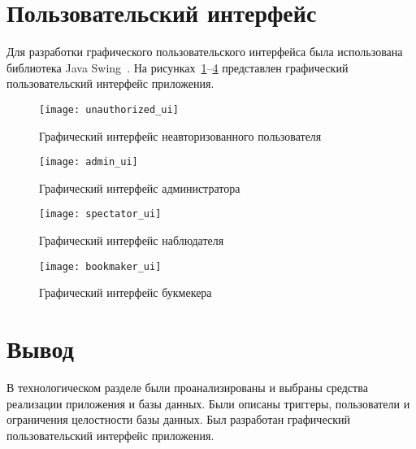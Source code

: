 \section{Пользовательский интерфейс}

Для разработки графического пользовательского интерфейса была использована библиотека Java Swing~\cite{swing}. На рисунках~\ref{unauthorized_ui}--\ref{bookmaker_ui} представлен графический пользовательский интерфейс приложения.
\begin{figure}[H]
	\centering
	\texttt{[image: unauthorized\_ui]}
	\caption{Графический интерфейс неавторизованного пользователя}
	\label{unauthorized_ui}
\end{figure}
\begin{figure}[H]
	\centering
	\texttt{[image: admin\_ui]}
	\caption{Графический интерфейс администратора}
	\label{admin_ui}
\end{figure}
\begin{figure}[H]
	\centering
	\texttt{[image: spectator\_ui]}
	\caption{Графический интерфейс наблюдателя}
	\label{spectator_ui}
\end{figure}
\begin{figure}[H]
	\centering
	\texttt{[image: bookmaker\_ui]}
	\caption{Графический интерфейс букмекера}
	\label{bookmaker_ui}
\end{figure}

\section*{Вывод}

В технологическом разделе были проанализированы и выбраны средства реализации приложения и базы данных. Были описаны триггеры, пользователи и ограничения целостности базы данных. Был разработан графический пользовательский интерфейс приложения.

\clearpage
